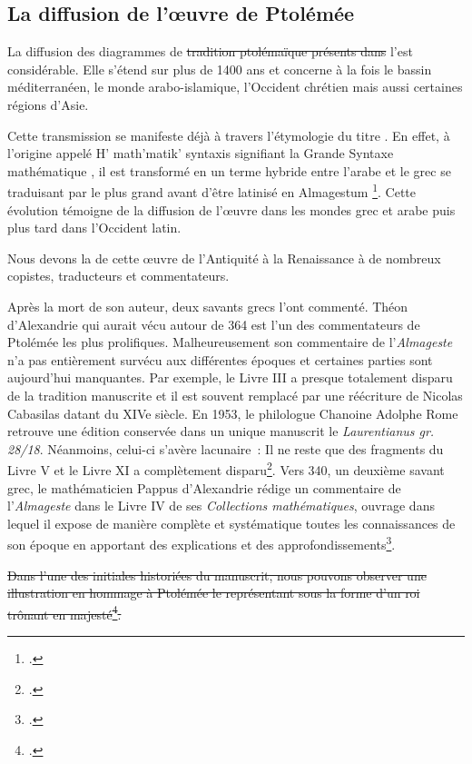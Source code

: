 \subsection{La diffusion de l'œuvre de Ptolémée}
La diffusion des diagrammes de \st{tradition ptolémaïque présents dans} l'\almageste est considérable.
Elle s'étend sur plus de 1400 ans et concerne à la fois le bassin méditerranéen, le monde arabo-islamique, l'Occident chrétien mais aussi certaines régions d'Asie.

Cette transmission se manifeste déjà à travers l'étymologie du titre \almageste.
En effet, à l'origine appelé \og H' math'matik' syntaxis \fg signifiant la \og Grande Syntaxe mathématique \fg,
il est transformé en un terme hybride entre l'arabe et le grec se traduisant par \og le plus grand \fg avant d'être latinisé en \og Almagestum \fg\footcite{raymondjonesPtolemyAccomplishmentsBiography2025}.
Cette évolution témoigne de la diffusion de l'œuvre dans les mondes grec et arabe puis plus tard dans l'Occident latin.

Nous devons la  de cette œuvre de l'Antiquité à la Renaissance à de nombreux copistes, traducteurs et commentateurs.

Après la mort de son auteur, deux savants grecs l'ont commenté.
Théon d'Alexandrie qui aurait vécu autour de 364 est l'un des commentateurs de Ptolémée les plus prolifiques.
Malheureusement son commentaire de l'\textit{Almageste} n'a pas entièrement survécu aux différentes époques et certaines parties sont aujourd'hui manquantes.
Par exemple, le Livre III a presque totalement disparu de la tradition manuscrite et il est souvent remplacé par une réécriture de Nicolas Cabasilas datant du XIVe siècle.
En 1953, le philologue Chanoine Adolphe Rome retrouve une édition conservée dans un unique manuscrit le \textit{Laurentianus gr. 28/18}.
Néanmoins, celui-ci s'avère lacunaire~: Il ne reste que des fragments du Livre V et le Livre XI a complètement disparu\footcite{tihonLivreRetrouveCommentaire1987}.
Vers 340, un deuxième savant grec, le mathématicien Pappus d'Alexandrie rédige un commentaire de l'\textit{Almageste} dans le Livre IV de ses \textit{Collections mathématiques},
ouvrage dans lequel il expose de manière complète et systématique toutes les connaissances de son époque en apportant des explications et des approfondissements\footcite{meyerPAPPUS1999}.

\st{Dans l'une des initiales historiées du manuscrit, nous pouvons observer une illustration en hommage à Ptolémée le représentant sous la forme d'un roi trônant en majesté\footcite{TraductionLatineLAlmageste}.}

